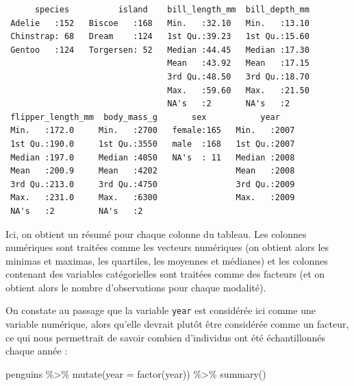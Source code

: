 \documentclass[
  a4paper,
  DIV=11,
  numbers=noendperiod,
  oneside]{scrreprt}
\newenvironment{Shaded}{}{}
\newcommand{\AttributeTok}[1]{\textcolor[rgb]{0.84,0.23,0.29}{#1}}
\newcommand{\FunctionTok}[1]{\textcolor[rgb]{0.44,0.26,0.76}{#1}}
\newcommand{\NormalTok}[1]{\textcolor[rgb]{0.14,0.16,0.18}{#1}}
\newcommand{\SpecialCharTok}[1]{\textcolor[rgb]{0.00,0.36,0.77}{#1}}
\begin{document}
\begin{verbatim}
      species          island    bill_length_mm  bill_depth_mm  
 Adelie   :152   Biscoe   :168   Min.   :32.10   Min.   :13.10  
 Chinstrap: 68   Dream    :124   1st Qu.:39.23   1st Qu.:15.60  
 Gentoo   :124   Torgersen: 52   Median :44.45   Median :17.30  
                                 Mean   :43.92   Mean   :17.15  
                                 3rd Qu.:48.50   3rd Qu.:18.70  
                                 Max.   :59.60   Max.   :21.50  
                                 NA's   :2       NA's   :2      
 flipper_length_mm  body_mass_g       sex           year     
 Min.   :172.0     Min.   :2700   female:165   Min.   :2007  
 1st Qu.:190.0     1st Qu.:3550   male  :168   1st Qu.:2007  
 Median :197.0     Median :4050   NA's  : 11   Median :2008  
 Mean   :200.9     Mean   :4202                Mean   :2008  
 3rd Qu.:213.0     3rd Qu.:4750                3rd Qu.:2009  
 Max.   :231.0     Max.   :6300                Max.   :2009  
 NA's   :2         NA's   :2                                 
\end{verbatim}

Ici, on obtient un résumé pour chaque colonne du tableau. Les colonnes
numériques sont traitées comme les vecteurs numériques (on obtient alors
les minimas et maximas, les quartiles, les moyennes et médianes) et les
colonnes contenant des variables catégorielles sont traitées comme des
facteurs (et on obtient alors le nombre d'observations pour chaque
modalité).

On constate au passage que la variable \texttt{year} est considérée ici
comme une variable numérique, alors qu'elle devrait plutôt être
considérée comme un facteur, ce qui nous permettrait de savoir combien
d'individus ont été échantillonnés chaque année :

\begin{Shaded}
\begin{Highlighting}[]
\NormalTok{penguins }\SpecialCharTok{\%\textgreater{}\%} 
  \FunctionTok{mutate}\NormalTok{(}\AttributeTok{year =} \FunctionTok{factor}\NormalTok{(year)) }\SpecialCharTok{\%\textgreater{}\%} 
  \FunctionTok{summary}\NormalTok{()}
\end{Highlighting}
\end{Shaded}
\end{document}
